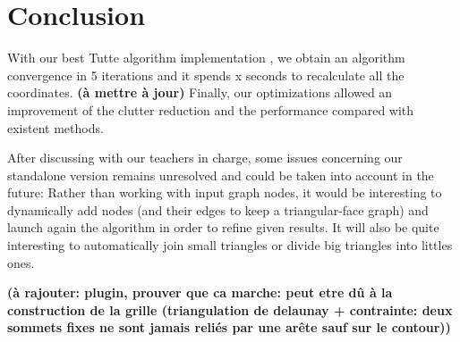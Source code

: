 \chapter*{Conclusion}


With our best Tutte algorithm implementation , we obtain an algorithm convergence in 5 iterations and it spends x seconds to recalculate all the coordinates. \textbf{(à mettre à jour)}
Finally, our optimizations allowed an improvement of the clutter reduction and the performance compared with existent methods.


After discussing with our teachers in charge, some issues concerning our standalone version remains unresolved and could be taken into account in the future: Rather than working with input graph nodes, it would be interesting to dynamically add nodes (and their edges to keep a triangular-face graph) and launch again the algorithm in order to refine given results. It will also be quite interesting to automatically join small triangles or divide big triangles into littles ones. 

\textbf{(à rajouter: plugin, prouver que ca marche: peut etre dû à la construction de la grille (triangulation de delaunay + contrainte: deux sommets fixes ne sont jamais reliés par une arête sauf sur le contour))}
